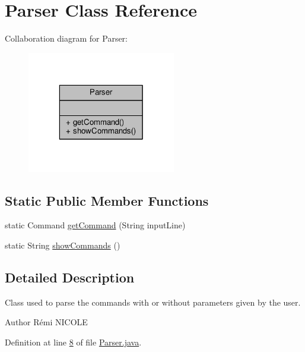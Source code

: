 \hypertarget{classParser}{\section{Parser Class Reference}
\label{classParser}
}


Collaboration diagram for Parser\-:
\nopagebreak
\begin{figure}[H]
\begin{center}
\leavevmode
\includegraphics[width=184pt]{classParser__coll__graph}
\end{center}
\end{figure}
\subsection*{Static Public Member Functions}
\begin{DoxyCompactItemize}
\item 
static Command \hyperlink{classParser_a4b9b987a0c1b0f4f742020f1be21edfa}{get\-Command} (String input\-Line)
\item 
static String \hyperlink{classParser_a2510fee1c8d7298e222edaf1f34660dc}{show\-Commands} ()
\end{DoxyCompactItemize}


\subsection{Detailed Description}
Class used to parse the commands with or without parameters given by the user. \begin{DoxyAuthor}{Author}
Rémi N\-I\-C\-O\-L\-E 
\end{DoxyAuthor}


Definition at line \hyperlink{Parser_8java_source_l00008}{8} of file \hyperlink{Parser_8java_source}{Parser.\-java}.



